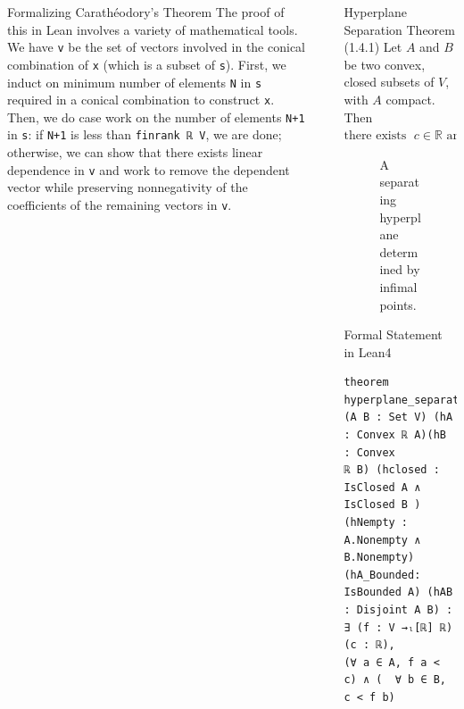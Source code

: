 \documentclass[final]{beamer}
\newlength{\sepwidth}
\newlength{\colwidth}
\newcommand{\separatorcolumn}{\begin{column}{\sepwidth}\end{column}}
\begin{document}
\begin{frame}[fragile]
\begin{columns}[t]
\begin{column}{\colwidth}
\begin{block}{Formalizing Carath\'eodory's Theorem}
              The proof of this in Lean involves a variety of mathematical tools. We have \verb|v| be the set of vectors involved in the conical combination of \verb|x| (which is a subset of \verb|s|). First, we induct on minimum number of elements \verb|N| in \verb|s| required in a conical combination to construct \verb|x|. Then, we do case work on the number of elements \verb|N+1| in \verb|s|: if \verb|N+1| is less than \verb|finrank ℝ V|, we are done; otherwise, we can show that there exists linear dependence in \verb|v| and work to remove the dependent vector while preserving nonnegativity of the coefficients of the remaining vectors in \verb|v|.  
            \end{block}    
            
            

        \end{column}

        \separatorcolumn

        \begin{column}{\colwidth}

            
          \begin{alertblock}{Hyperplane Separation Theorem (1.4.1)}
            Let $A$ and $B$ be two convex, closed subsets of $V$, with $A$ compact. Then $
                \text{there exists } \; c\in \mathbb{R} \text{ and a linear functional } f : V\to \mathbb{R} \; \text{such that} \; f(a) < c \; \text{for all}\; a\in A \text{ and } \ c < f(b)\; \text{for all}\; b\in B.
              $
        \end{alertblock}

        \begin{figure}[htbp]
            \centering
            
            \caption{A separating hyperplane determined by infimal points. \label{fig:hyperplane-separation}}
        \end{figure}

\begin{block}{Formal Statement in Lean4}
\vspace{-0.5em}
\begin{Verbatim}
theorem hyperplane_separation  (A B : Set V) (hA : Convex ℝ A)(hB : Convex 
ℝ B) (hclosed : IsClosed A ∧ IsClosed B )(hNempty : A.Nonempty ∧ B.Nonempty) 
(hA_Bounded: IsBounded A) (hAB : Disjoint A B) : ∃ (f : V →ₗ[ℝ] ℝ) (c : ℝ),
(∀ a ∈ A, f a < c) ∧ (  ∀ b ∈ B, c < f b)
\end{Verbatim}
\end{block}


\end{column}
\end{columns}
\end{frame}
\end{document}
